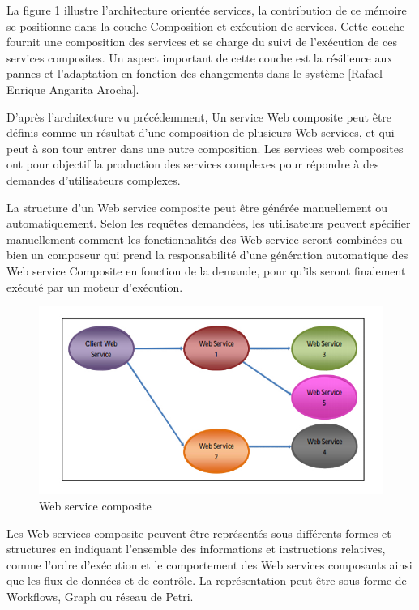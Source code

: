 La figure 1 illustre l'architecture orientée services, la contribution de ce mémoire se positionne dans la couche Composition et exécution de services.
Cette couche fournit une composition des services et se charge du suivi de l’exécution de ces services composites. Un aspect important de cette couche est la résilience aux
pannes et l’adaptation en fonction des changements dans le système [Rafael Enrique Angarita Arocha].



D'après l'architecture vu précédemment, Un service Web composite peut être définis comme un  résultat d’une composition de plusieurs Web services, et qui peut à son tour entrer dans une autre composition.
Les  services web composites ont pour objectif  la production des services complexes pour répondre à des demandes d’utilisateurs complexes. 

La structure d’un Web service composite peut être générée manuellement ou automatiquement. Selon les requêtes demandées, les utilisateurs peuvent spécifier manuellement comment les fonctionnalités des Web service seront combinées ou bien  un composeur qui prend la responsabilité d’une génération automatique des Web service Composite en fonction de la demande, pour qu’ils seront finalement exécuté par un moteur d’exécution.


\begin{figure}[H]
\begin{center}
\includegraphics[width=1\linewidth]{images/CWS.jpg}
\end{center}
\caption{Web service composite}
\label{fig:2}
\end{figure}



Les Web services composite peuvent être représentés sous différents formes et structures en indiquant l’ensemble des informations et instructions relatives, comme l’ordre d’exécution et le comportement des Web services composants ainsi que les flux de données  et de contrôle.
La représentation peut être sous forme de Workflows, Graph ou réseau de Petri.



